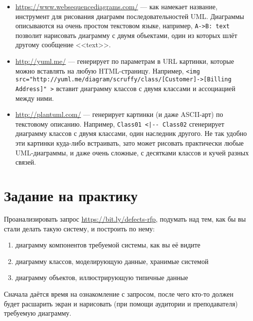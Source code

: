 \documentclass[a5paper]{article}
\begin{document}
\begin{itemize}
    \begin{itemize}
        \item \url{https://www.websequencediagrams.com/} --- как намекает название, инструмент для рисования диаграмм последовательностей UML. Диаграммы описываются на очень простом текстовом языке, например, \verb|A->B: text| позволит нарисовать диаграмму с двумя объектами, один из которых шлёт другому сообщение <<text>>.
        \item \url{http://yuml.me/} --- генерирует по параметрам в URL картинки, которые можно вставлять на любую HTML-страницу. Например, \verb|<img src="http://yuml.me/diagram/scruffy/class/[Customer]->[Billing Address]" >| вставит диаграмму классов с двумя классами и ассоциацией между ними.
        \item \url{http://plantuml.com/} --- генерирует картинки (и даже ASCII-арт) по текстовому описанию. Например, \verb&Class01 <|-- Class02& сгенерирует диаграмму классов с двумя классами, один наследник другого. Не так удобно эти картинки куда-либо встраивать, зато может рисовать практически любые UML-диаграммы, и даже очень сложные, с десятками классов и кучей разных связей.
    \end{itemize}
\end{itemize}

\section{Задание на практику}

Проанализировать запрос \url{https://bit.ly/defects-rfp}, подумать над тем, как бы вы стали делать такую систему, и построить по нему:

\begin{enumerate}
    \item диаграмму компонентов требуемой системы, как вы её видите
    \item диаграмму классов, моделирующую данные, хранимые системой
    \item диаграмму объектов, иллюстрирующую типичные данные
\end{enumerate}

Сначала даётся время на ознакомление с запросом, после чего кто-то должен будет расшарить экран и нарисовать (при помощи аудитории и преподавателя) требуемую диаграмму.
\end{document}
